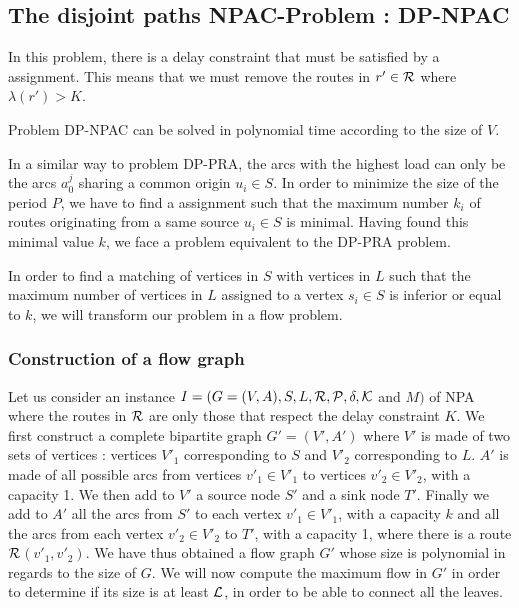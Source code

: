 \documentclass{article}
\newcommand\rmatching{assignment\xspace}
\begin{document}



\subsection{The disjoint paths NPAC-Problem : DP-NPAC}

In this problem, there is a delay constraint that must be satisfied by a \rmatching. This means that we must remove the routes in $r' \in \cal R$ where $\lambda(r') > K$.

\begin{proposition}
\label{DP-NPAC}
Problem DP-NPAC can be solved in polynomial time according to the size of $V$.
\end{proposition}

In a similar way to problem DP-PRA, the arcs with the highest load can only be the arcs $a_0^j$ sharing a common origin $u_i \in S$. In order to minimize the size of the period $P$, we have to find a \rmatching such that the maximum number $k_i$ of routes originating from a same source $u_i \in S$ is minimal. Having found this minimal value $k$, we face a problem equivalent to the DP-PRA problem.

In order to find a matching of vertices in $S$ with vertices in $L$ such that the maximum number of vertices in $L$ assigned to a vertex $s_i \in S$ is inferior or equal to $k$, we will transform our problem in a flow problem.

\subsubsection{Construction of a flow graph}

Let us consider an instance $I= (G=(V,A), S, L, \cal R, P, \delta, K$ and $M)$ of NPA where the routes in $\cal R$ are only those that respect the delay constraint $K$. We first construct a complete bipartite graph $G'=(V',A')$ where $V'$ is made of two sets of vertices : vertices $V'_1$ corresponding to $S$ and $V'_2$ corresponding to $ L$. $A'$ is made of all possible arcs from vertices $v'_1 \in V'_1$ to vertices $v'_2 \in V'_2$, with a capacity 1. We then add to $V'$ a source node $S'$ and a sink node $T'$. Finally we add to $A'$ all the arcs from $S'$ to each vertex $v'_1 \in V'_1$, with a capacity $k$  and all the arcs from each vertex $v'_2 \in V'_2$ to $T'$, with a capacity 1, where there is a route $\cal R$$(v'_1, v'_2)$. We have thus obtained a flow graph $G'$ whose size is polynomial in regards to the size of $G$. We will now compute the maximum flow in $G'$ in order to determine if its size is at least $\cal L$, in order to be able to connect all the leaves.
\end{document}
